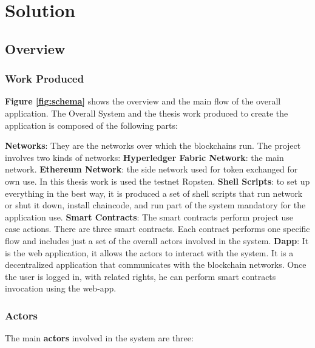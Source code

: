 \chapter{Solution}


\section{Overview} 


\subsection{Work Produced}

\textbf{Figure \ref{fig:schema}} shows the overview and the main flow of the overall application.
The Overall System and the thesis work produced to create the application is composed of the following parts:
\begin{outline}
    \1 \textbf{Networks}: They are the networks over which the blockchains run. The project involves two kinds of networks:
    \2 \textbf{Hyperledger Fabric Network}: the main network.
    \2 \textbf{Ethereum Network}: the side network used for token exchanged for own use. In this thesis work
    is used the testnet Ropsten.    
    \1 \textbf{Shell Scripts}: to set up everything in the best way, it is produced a set of 
    shell scripts that run network or shut it down, install chaincode, and run part of the system mandatory 
    for the application use. 
    \1 \textbf{Smart Contracts}: The smart contracts perform project use case actions. 
    There are three smart contracts. Each contract performs one specific flow and includes just
    a set of the overall actors involved in the system.  
    \1 \textbf{Dapp}: It is the web application, it allows the actors to interact with the system. It is a 
    decentralized application that communicates with the blockchain networks. Once the user is logged in, 
    with related rights, he can perform smart contracts invocation using the web-app.
\end{outline}

\subsection{Actors}

The main \textbf{actors} involved in the system are three:

